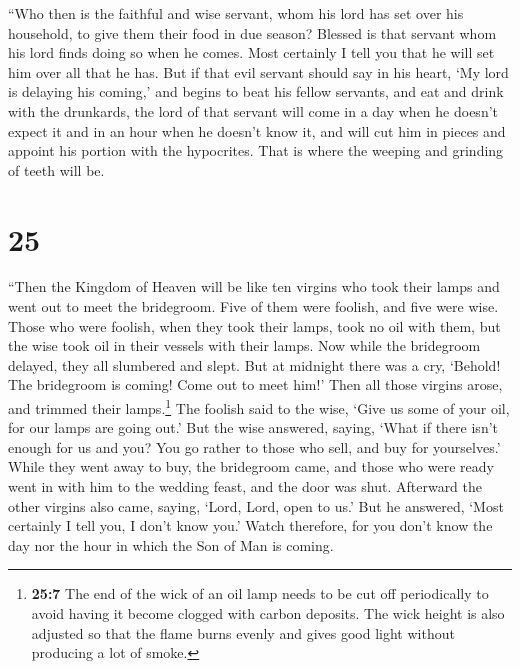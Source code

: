  ``Who then is the faithful and wise servant, whom his
lord has set over his household, to give them their food in due season?
 Blessed is that servant whom his lord finds doing so
when he comes.  Most certainly I tell you that he will
set him over all that he has.  But if that evil servant
should say in his heart, `My lord is delaying his coming,'
 and begins to beat his fellow servants, and eat and
drink with the drunkards,  the lord of that servant will
come in a day when he doesn't expect it and in an hour when he doesn't
know it,  and will cut him in pieces and appoint his
portion with the hypocrites. That is where the weeping and grinding of
teeth will be.

\hypertarget{section-24}{%
\section{25}\label{section-24}}

 ``Then the Kingdom of Heaven will be like ten virgins who
took their lamps and went out to meet the bridegroom. 
Five of them were foolish, and five were wise.  Those who
were foolish, when they took their lamps, took no oil with them,
 but the wise took oil in their vessels with their lamps.
 Now while the bridegroom delayed, they all slumbered and
slept.  But at midnight there was a cry, `Behold! The
bridegroom is coming! Come out to meet him!'  Then all
those virgins arose, and trimmed their lamps.\footnote{\textbf{25:7} The
  end of the wick of an oil lamp needs to be cut off periodically to
  avoid having it become clogged with carbon deposits. The wick height
  is also adjusted so that the flame burns evenly and gives good light
  without producing a lot of smoke.}  The foolish said to
the wise, `Give us some of your oil, for our lamps are going out.'
 But the wise answered, saying, `What if there isn't
enough for us and you? You go rather to those who sell, and buy for
yourselves.'  While they went away to buy, the bridegroom
came, and those who were ready went in with him to the wedding feast,
and the door was shut.  Afterward the other virgins also
came, saying, `Lord, Lord, open to us.'  But he answered,
`Most certainly I tell you, I don't know you.'  Watch
therefore, for you don't know the day nor the hour in which the Son of
Man is coming.

